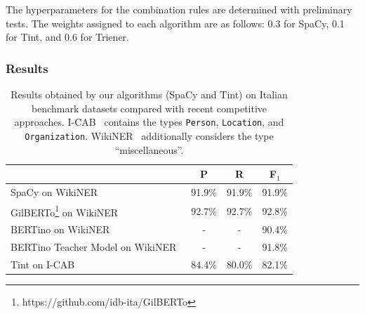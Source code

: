 The hyperparameters for the combination rules are determined with preliminary tests. The weights assigned to each algorithm are as follows: 0.3 for SpaCy, 0.1 for Tint, and 0.6 for Trie\ac{ner}.


% 

\subsubsection{Results}\label{sec:results}


\begin{table}[H]
    \centering
    \begin{tabular}{l|ccc}
        & P & R & F$_1$ \\
        \hline
        SpaCy on WikiNER~\cite{NOTHMAN2013151} & 91.9\% & 91.9\% & 91.9\% \\
        GilBERTo\footnote{https://github.com/idb-ita/GilBERTo} on WikiNER & 92.7\% & 92.7\% &	92.8\% \\
        BERTino on WikiNER~\cite{muffo2023bertino} & - & - & 90.4\% \\
        BERTino Teacher Model on WikiNER~\cite{muffo2023bertino} & - & - & 91.8\% \\
        Tint on I-CAB~\cite{magnini-etal-2006-cab} & 84.4\% & 80.0\% & 82.1\% \\
    \end{tabular}
    \caption{Results obtained by our algorithms (SpaCy and Tint) on Italian benchmark datasets compared with recent competitive approaches. I-CAB~\cite{magnini-etal-2006-cab} contains the types \texttt{Person}, \texttt{Location}, and \texttt{Organization}. WikiNER~\cite{NOTHMAN2013151} additionally considers the type ``miscellaneous''.}
    \label{tab:sotaner}
\end{table}

